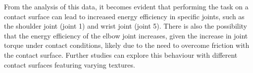 \documentclass[report.tex]{subfiles}
\begin{document}
    From the analysis of this data, it becomes evident that performing the task on a contact surface can lead to increased energy efficiency in specific joints, such as the shoulder joint (joint 1) and wrist joint (joint 5). There is also the possibility that the energy efficiency of the elbow joint increases, given the increase in joint torque under contact conditions, likely due to the need to overcome friction with the contact surface. Further studies can explore this behaviour with different contact surfaces featuring varying textures.
\begin{table}[H]
    \centering
\end{table}
\end{document}
